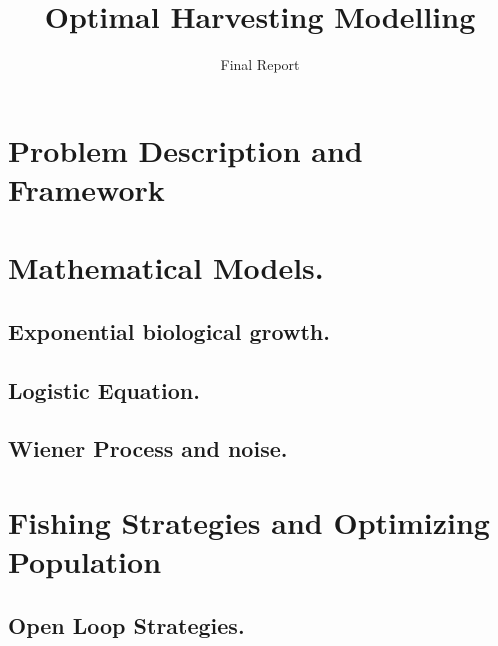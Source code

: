 \documentclass[twoside,colorback,accentcolor=tud4c,11pt]{tudreport}
\title{Optimal Harvesting Modelling}
\subtitle{Final Report}
\begin{document}
\maketitle
\begin{abstract}
	
\end{abstract}  

\tableofcontents
%
\chapter{Problem Description and Framework}\label{chap:Problem Framework}
\graphicspath{{ProblemFramework/}}

\chapter{Mathematical Models.} \label{chap: Deterministic Model}
	
	\section{Exponential biological growth.}
		\graphicspath{{Model/ExponentialGrowth/}}
		
	\section{Logistic Equation.}
		\graphicspath{{Model/LogisticEquation/}}
		
	\section{Wiener Process and noise.} 
		\graphicspath{{Model/WienerProcess/}}
		
\chapter{Fishing Strategies and Optimizing Population} \label{chap: Fishing Strategies}
	\section{Open Loop Strategies.}
	\graphicspath{{FishingStrategies/OpenLoop/}{FishingStrategies/OpenLoop/ConstantHarvest/}{FishingStrategies/OpenLoop/TimeHarvesting/}{FishingStrategies/OpenLoop/OptimalControl/}}
	
\end{document}
